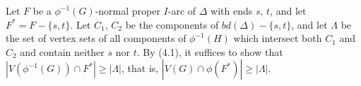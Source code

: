 Let $F$ be a $\phi^{-1}(G)$-normal proper $I$-arc of $\Delta$ with ends $s$, $t$, and let $F^* = F - \{s, t\}$. Let $C_1$, $C_2$ be the components of $bd(\Delta) - \{s, t\}$, and let $\Lambda$ be the set of vertex sets of all components of $\phi^{-1}(H)$ which intersect both $C_1$ and $C_2$ and contain neither $s$ nor $t$. By (4.1), it suffices to show that $|V(\phi^{-1}(G)) \cap F^*| \ge |\Lambda|$, that is, $|V(G) \cap \phi(F^*)| \ge |\Lambda|$.
